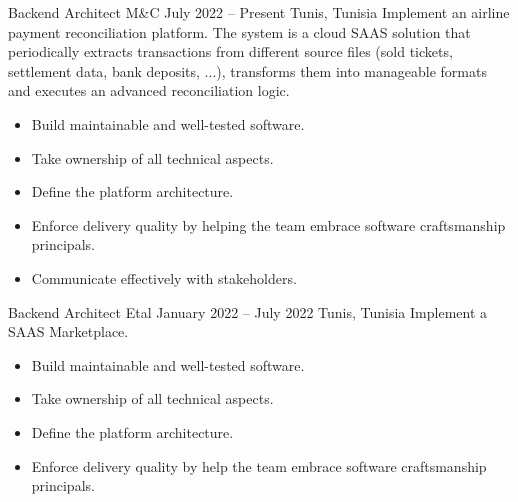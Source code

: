 \documentclass[10pt,a4paper]{resume-settings}
\begin{document}

\begin{fullwidth}
\makecvheader
\end{fullwidth}



\cvevent
    {Backend Architect}
    {M\&C}
    {July 2022 -- Present}
    {Tunis, Tunisia}
    {Implement an airline payment reconciliation platform. The system is a cloud SAAS solution that periodically extracts transactions from different source files (sold tickets, settlement data, bank deposits, ...), transforms them into manageable formats and executes an advanced reconciliation logic.}
    \begin{itemize}
        \item Build maintainable and well-tested software.
        \item Take ownership of all technical aspects.
        \item Define the platform architecture.
        \item Enforce delivery quality by helping the team embrace software craftsmanship principals.
        \item Communicate effectively with stakeholders.
    \end{itemize}
\divider

\cvevent
    {Backend Architect}
    {Etal}
    {January 2022 -- July 2022}
    {Tunis, Tunisia}
    {Implement a SAAS Marketplace.} 
    \begin{itemize}
        \item Build maintainable and well-tested software.
        \item Take ownership of all technical aspects.
        \item Define the platform architecture.
        \item Enforce delivery quality by help the team embrace software craftsmanship principals.
    \end{itemize}
\divider
\end{document}
